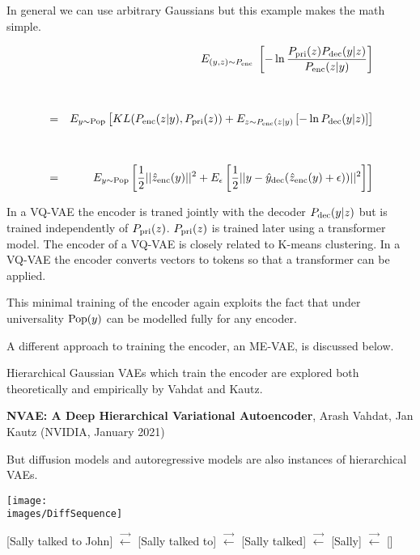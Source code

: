 {\vfill
In general we can use arbitrary Gaussians but this example makes the math simple.

{\huge
\begin{eqnarray*}
&  & E_{(y,z) \sim P_{\mathrm{enc}}}\;\left[- \ln \frac{P_{\mathrm{pri}}(z)P_{\mathrm{dec}}(y|z)}{P_{\mathrm{enc}}(z|y)}\right] \\
\\
\\
& = & E_{y \sim \mathrm{Pop}} \left[ KL(P_{\mathrm{enc}}(z|y),P_{\mathrm{pri}}(z)) + E_{z \sim P_{\mathrm{enc}}(z|y)}\left[- \ln P_{\mathrm{dec}}(y|z)\right]\right] \\
\\
\\
&=& E_{y \sim \mathrm{Pop}} \left[\frac{1}{2}||\hat{z}_{\mathrm{enc}}(y)||^2 + E_\epsilon\left[\frac{1}{2}||y - \hat{y}_{\mathrm{dec}}(\hat{z}_{\mathrm{enc}}(y)+\epsilon))||^2\right]\right]
\end{eqnarray*}
}


In a VQ-VAE the encoder is traned jointly with the decoder $P_{\mathrm{dec}}(y|z)$ but is trained independently of $P_{\mathrm{pri}}(z)$.  $P_{\mathrm{pri}}(z)$ is trained later using a transformer model.
The encoder of a VQ-VAE is closely related to K-means clustering.   In a VQ-VAE the encoder converts vectors to tokens
so that a transformer can be applied.

\vfill
This minimal training of the encoder again exploits the fact that under universality $\mathrm{Pop}(y)$ can be modelled fully for any encoder.


\vfill
A different approach to training the encoder, an ME-VAE, is discussed below.


Hierarchical Gaussian VAEs which train the encoder are explored both theoretically and empirically by Vahdat and Kautz.

\vfill
{\huge {\bf NVAE: A Deep Hierarchical Variational Autoencoder}, Arash Vahdat, Jan Kautz (NVIDIA, January 2021)}

\vfill
But diffusion models and autoregressive models are also instances of hierarchical VAEs.


\centerline{\texttt{[image: \\images/DiffSequence]}}

\vfill
{\huge
\centerline{{\color{red} [Sally talked to John]} $\stackrel{\rightarrow}{\leftarrow}$ {\color{red} [Sally talked to]}
$\stackrel{\rightarrow}{\leftarrow}$ {\color{red}[Sally talked]} $\stackrel{\rightarrow}{\leftarrow}$ {\color{red}[Sally]} $\stackrel{\rightarrow}{\leftarrow}$ {\color{red} []}}
}

}
